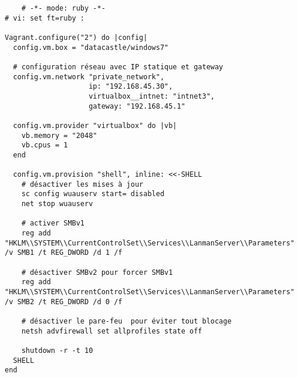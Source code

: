 \documentclass[a4paper,12pt]{report}
\begin{document}
\begin{lstlisting}
    # -*- mode: ruby -*-
# vi: set ft=ruby :

Vagrant.configure("2") do |config|
  config.vm.box = "datacastle/windows7"  
  
  # configuration réseau avec IP statique et gateway
  config.vm.network "private_network", 
                    ip: "192.168.45.30", 
                    virtualbox__intnet: "intnet3",
                    gateway: "192.168.45.1"

  config.vm.provider "virtualbox" do |vb|
    vb.memory = "2048"  
    vb.cpus = 1         
  end

  config.vm.provision "shell", inline: <<-SHELL
    # désactiver les mises à jour 
    sc config wuauserv start= disabled
    net stop wuauserv

    # activer SMBv1 
    reg add "HKLM\\SYSTEM\\CurrentControlSet\\Services\\LanmanServer\\Parameters" /v SMB1 /t REG_DWORD /d 1 /f

    # désactiver SMBv2 pour forcer SMBv1
    reg add "HKLM\\SYSTEM\\CurrentControlSet\\Services\\LanmanServer\\Parameters" /v SMB2 /t REG_DWORD /d 0 /f

    # désactiver le pare-feu  pour éviter tout blocage 
    netsh advfirewall set allprofiles state off

    shutdown -r -t 10
  SHELL
end

\end{lstlisting}
\end{document}
